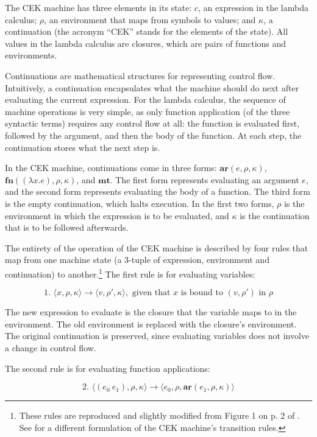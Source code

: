\documentclass{article}
\begin{document}
The CEK machine has three elements in its state: $c$, an expression in the lambda calculus; $\rho$, an environment that maps from symbols to values; and $\kappa$, a continuation (the acronym ``CEK'' stands for the elements of the state). All values in the lambda calculus are closures, which are pairs of functions and environments.

Continuations are mathematical structures for representing control flow. Intuitively, a continuation encapsulates what the machine should do next after evaluating the current expression. For the lambda calculus, the sequence of machine operations is very simple, as only function application (of the three syntactic terms) requires any control flow at all: the function is evaluated first, followed by the argument, and then the body of the function. At each step, the continuation stores what the next step is.

In the CEK machine, continuations come in three forms: $\textbf{ar}(e, \rho, \kappa)$, $\textbf{fn}((\lambda x.e), \rho, \kappa)$, and $\textbf{mt}$. The first form represents evaluating an argument $e$, and the second form represents evaluating the body of a function. The third form is the empty continuation, which halts execution. In the first two forms, $\rho$ is the environment in which the expression is to be evaluated, and $\kappa$ is the continuation that is to be followed afterwards.

The entirety of the operation of the CEK machine is described by four rules that map from one machine state (a 3-tuple of expression, environment and continuation) to another.\footnote{These rules are reproduced and slightly modified from Figure 1 on p. 2 of \cite{aam}. See \cite{cek} for a different formulation of the CEK machine's transition rules.} The first rule is for evaluating variables:

$$
\text{1. }
\langle x, \rho, \kappa \rangle
\to
\langle v, \rho', \kappa \rangle,
\text{ given that $x$ is bound to $(v, \rho')$ in $\rho$}
$$

The new expression to evaluate is the closure that the variable maps to in the environment. The old environment is replaced with the closure's environment. The original continuation is preserved, since evaluating variables does not involve a change in control flow.

The second rule is for evaluating function applications:

$$
\text{2. }
\langle (e_0\ e_1), \rho, \kappa \rangle
\to
\langle e_0, \rho, \textbf{ar}(e_1, \rho, \kappa) \rangle
$$
\end{document}
